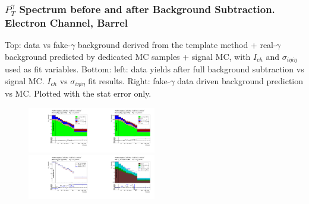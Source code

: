 \begin{frame}\frametitle{\footnotesize{$P_T^{\gamma}$ Spectrum before and after Background Subtraction. Electron Channel, Barrel}}
  \tiny{Top: data vs fake-$\gamma$ background derived from the template method + real-$\gamma$ background predicted by dedicated MC samples + signal MC, with $I_{ch}$ and $\sigma_{i\eta{i}\eta}$ used as fit variables. Bottom: left: data yields after full background subtraction vs signal MC. $I_{ch}$ vs $\sigma_{i\eta{i}\eta}$ fit results. Right: fake-$\gamma$ data driven background prediction vs MC. Plotted with the stat error only.}
  \begin{figure}[htb]
    \begin{center}
       \includegraphics[width=0.25\textwidth]{../figs/figs_v11/ELECTRON_WGamma/PrepareYields/c_DATAvsBkgPlusSigMCc_ELECTRON_WGamma_TEMPL_CHISO_UNblind__Barrel__phoEt.pdf}\includegraphics[width=0.25\textwidth]{../figs/figs_v11/ELECTRON_WGamma/PrepareYields/c_DATAvsBkgPlusSigMCc_ELECTRON_WGamma_TEMPL_SIHIH_UNblind__Barrel__phoEt.pdf}\\
       \includegraphics[width=0.25\textwidth]{../figs/figs_v11/ELECTRON_WGamma/PrepareYields/c_BkgSubtrDATAvsSIGMC_c_ELECTRON_WGamma__UNblind__Barrel__phoEt.pdf}\includegraphics[width=0.25\textwidth]{../figs/figs_v11/ELECTRON_WGamma/PrepareYields/c_FakeDDvsMC_c_ELECTRON_WGamma__UNblind__Barrel__phoEt.pdf}\\
    \end{center}
  \end{figure}
\end{frame}%

